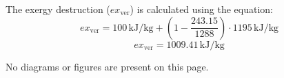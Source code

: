 The exergy destruction (\( ex_{\text{ver}} \)) is calculated using the equation:  
\[
ex_{\text{ver}} = 100 \, \text{kJ/kg} + \left( 1 - \frac{243.15}{1288} \right) \cdot 1195 \, \text{kJ/kg}  
\]  
\[
ex_{\text{ver}} = 1009.41 \, \text{kJ/kg}  
\]  

No diagrams or figures are present on this page.